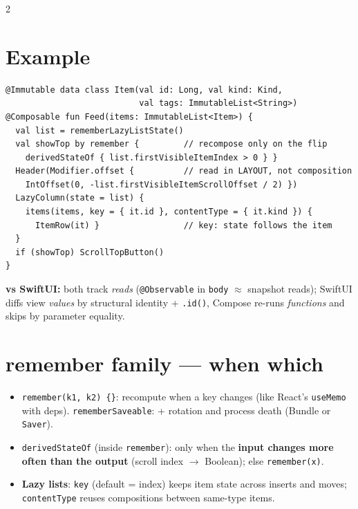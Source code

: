 \documentclass[8pt]{extarticle}
\begin{document}
\begin{multicols}{2}
\section{Example}
\begin{lstlisting}[language=KotlinSheet]
@Immutable data class Item(val id: Long, val kind: Kind,
                           val tags: ImmutableList<String>)
@Composable fun Feed(items: ImmutableList<Item>) {
  val list = rememberLazyListState()
  val showTop by remember {         // recompose only on the flip
    derivedStateOf { list.firstVisibleItemIndex > 0 } }
  Header(Modifier.offset {          // read in LAYOUT, not composition
    IntOffset(0, -list.firstVisibleItemScrollOffset / 2) })
  LazyColumn(state = list) {
    items(items, key = { it.id }, contentType = { it.kind }) {
      ItemRow(it) }                 // key: state follows the item
  }
  if (showTop) ScrollTopButton()
}
\end{lstlisting}

\textbf{vs SwiftUI:} both track \emph{reads} (\texttt{@Observable} in \texttt{body} $\approx$
snapshot reads); SwiftUI diffs view \emph{values} by structural identity + \texttt{.id()},
Compose re-runs \emph{functions} and skips by parameter equality.

\columnbreak

\section{remember family — when which}
\begin{itemize}\raggedright
  \item \texttt{remember(k1, k2) \{\}}: recompute when a key changes (like React's \texttt{useMemo} with deps).
        \texttt{rememberSaveable}: + rotation and process death (Bundle or \texttt{Saver}).
  \item \texttt{derivedStateOf} (inside \texttt{remember}): only when the \textbf{input changes
        more often than the output} (scroll index $\to$ Boolean); else \texttt{remember(x)}.
  \item \textbf{Lazy lists}: \texttt{key} (default = index) keeps item state across inserts
        and moves; \texttt{contentType} reuses compositions between same-type items.
\end{itemize}


\end{multicols}
\end{document}

